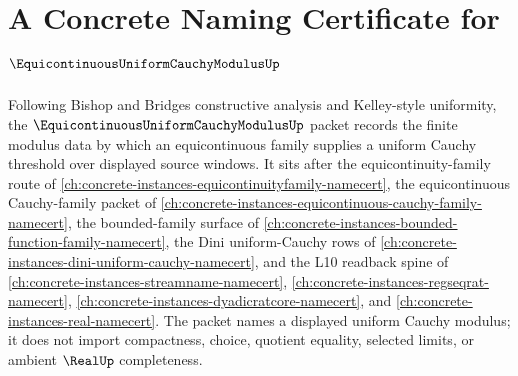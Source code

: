 \chapter{A Concrete Naming Certificate for $\EquicontinuousUniformCauchyModulusUp$}
\label{ch:concrete-instances-equicontinuous-uniform-cauchy-modulus-namecert}

Following Bishop and Bridges constructive analysis and Kelley-style uniformity, the $\EquicontinuousUniformCauchyModulusUp$ packet records the finite modulus data by which an equicontinuous family supplies a uniform Cauchy threshold over displayed source windows. It sits after the equicontinuity-family route of \autoref{ch:concrete-instances-equicontinuityfamily-namecert}, the equicontinuous Cauchy-family packet of \autoref{ch:concrete-instances-equicontinuous-cauchy-family-namecert}, the bounded-family surface of \autoref{ch:concrete-instances-bounded-function-family-namecert}, the Dini uniform-Cauchy rows of \autoref{ch:concrete-instances-dini-uniform-cauchy-namecert}, and the L10 readback spine of \autoref{ch:concrete-instances-streamname-namecert}, \autoref{ch:concrete-instances-regseqrat-namecert}, \autoref{ch:concrete-instances-dyadicratcore-namecert}, and \autoref{ch:concrete-instances-real-namecert}. The packet names a displayed uniform Cauchy modulus; it does not import compactness, choice, quotient equality, selected limits, or ambient $\RealUp$ completeness.

